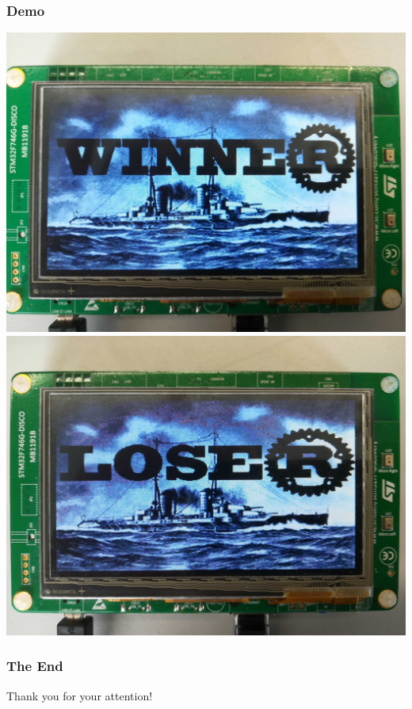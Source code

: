 \documentclass[handout]{beamer}
\begin{document}
\begin{frame}
	\frametitle{Demo}
	\begin{center}
		\includegraphics[scale=0.035]{Bilder/win.jpg}
		\includegraphics[scale=0.035]{Bilder/lose.jpg}
	\end{center}
\end{frame}

\begin{frame}
	\frametitle{The End}
	\begin{center}
	\Huge Thank you for your attention!
	\end{center}
\end{frame}
\end{document}
